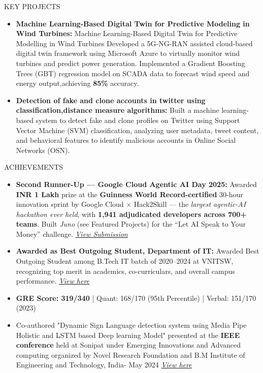 \documentclass{resume} %
\begin{document}
\begin{rSection}{KEY PROJECTS}
\begin{itemize}
\itemsep -3pt {}
    \item \textbf{Machine Learning-Based Digital Twin for Predictive Modeling in Wind Turbines:} Machine Learning-Based Digital Twin for Predictive Modelling in Wind Turbines Developed a 5G-NG-RAN assisted cloud-based digital twin framework using Microsoft Azure to virtually monitor wind turbines and predict power generation. Implemented a Gradient Boosting Trees (GBT) regression model on SCADA data to forecast wind speed and energy output,achieving \textbf{85\%} accuracy.
    \item \textbf{Detection of fake and clone accounts in twitter using classification,distance measure algorithms:} Built a machine learning-based system to detect fake and clone profiles on Twitter using Support Vector Machine (SVM) classification, analyzing user metadata, tweet content, and behavioral features to identify malicious accounts in Online Social Networks (OSN). 
\end{itemize}
\end{rSection}
\begin{rSection}{ACHIEVEMENTS} 
\begin{itemize}
     \item \textbf{Second Runner-Up — Google Cloud Agentic AI Day 2025:} Awarded \textbf{INR 1 Lakh} prize at the \textbf{Guinness World Record-certified} 30-hour innovation sprint by Google Cloud $\times$ Hack2Skill — the \textit{largest agentic-AI hackathon ever held}, with \textbf{1,941 adjudicated developers across 700+ teams}. Built \textit{Juno} (see Featured Projects) for the ``Let AI Speak to Your Money'' challenge. \href{https://drive.google.com/drive/folders/1cvr_w2xa_Q_uR6WmOFlj13R-buiMEQ7H?usp=sharing}{\textit{View Submission}}
   
    \item \textbf{Awarded as Best Outgoing Student, Department of IT:} Awarded Best Outgoing Student among B.Tech IT batch of 2020–2024 at VNITSW, recognizing top merit in academics, co-curriculars, and overall campus performance.
   \href{https://drive.google.com/drive/folders/1XbIEOGK1TiIXEYllnyi6C7TYoNTJv1rY?usp=sharing} {\textit{ View here}}

    \item \textbf {GRE Score: 319/340} | Quant: 168/170 (95th Percentile) | Verbal: 151/170 (2023)

   \item Co-authored "Dynamic Sign Language detection system using Media Pipe Holistic and LSTM based Deep learning Model" presented at the \textbf{IEEE conference} held at Sonipat under Emerging Innovations and Advanced computing organized by Novel Research Foundation and B.M Institute of Engineering and Technology, India- May 2024
  \href{https://ieeexplore.ieee.org/document/10664073}{\textit{View here}}

\end{itemize}
\end{rSection}
\end{document}
